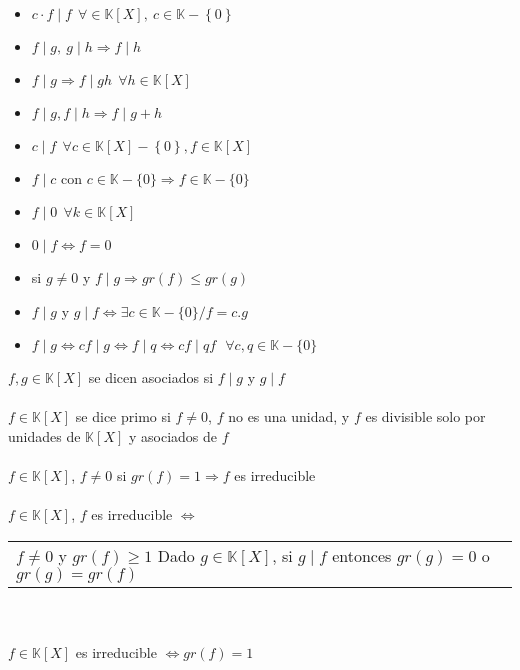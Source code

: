 \documentclass[a4paper,10pt]{article}
\begin{document}
\propiedades
\begin{itemize}
	\item $c \cdot f \mid f \ \ \forall \in \mathbb{K}[X], \ c \in \mathbb{K}-\left\lbrace 0 \right\rbrace$
	\item $f \mid g, \ g \mid h \Rightarrow f \mid h$
	\item $f \mid g \Rightarrow f \mid gh \ \ \forall h \in \mathbb{K}[X]$
	\item $f \mid g, f \mid h \Rightarrow f \mid g + h$
	\item $c \mid f \ \ \forall c \in \mathbb{K}[X] - \left\lbrace 0 \right\rbrace, f \in \mathbb{K}[X]$
	\item $f \mid c \mbox{ con } c \in \mathbb{K} - \{0\} \Rightarrow f \in \mathbb{K}-\{0\}$
	\item $f \mid 0 \ \ \forall k \in \mathbb{K}[X]$
	\item $0 \mid f \Leftrightarrow f = 0$
	\item si $g \neq 0$ y $f \mid g \Rightarrow gr(f) \leq gr(g)$ 
	\item $f \mid g$ y $g \mid f \Leftrightarrow \exists c \in \mathbb{K} - \{0\} / f = c.g$
	\item $f \mid g \Leftrightarrow cf \mid g \Leftrightarrow f \mid q \Leftrightarrow cf \mid qf \ \ \ \forall c,q \in \mathbb{K}-\{0\}$
\end{itemize}

 $f,g \in \mathbb{K}[X]$ se dicen asociados si $f \mid g$ y $g \mid f$ \\ \\

 $f \in \mathbb{K}[X]$ se dice primo si $f \neq 0$, $f$ no es una unidad, y $f$ es divisible solo por unidades de $\mathbb{K}[X]$ y asociados de $f$ \\ \\

 $f \in \mathbb{K}[X]$, $f \neq 0$ si $gr(f) = 1 \Rightarrow f$ es irreducible \\ \\

 $f \in \mathbb{K}[X]$, $f$ es irreducible $\Leftrightarrow$
\begin{tabular}{l}
	$f \neq 0$ y $gr(f) \geq 1$
	\cr Dado $g \in \mathbb{K}[X]$, si $g \mid f$ entonces $gr(g) = 0$ o $gr(g) = gr(f)$
\end{tabular} \\ \\

\propiedad $f \in \mathbb{K}[X]$ es irreducible $\Leftrightarrow gr(f)=1$ \\ \\
\end{document}

